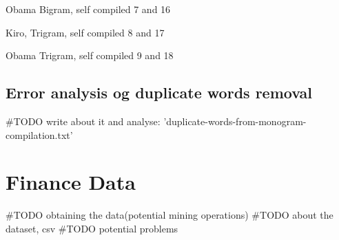 Obama Bigram, self compiled
7 and 16

Kiro, Trigram, self compiled
8 and 17

Obama Trigram, self compiled
9 and 18
%

\subsection{Error analysis og duplicate words removal}
#TODO write about it and analyse:
'duplicate-words-from-monogram-compilation.txt'
%

\section{Finance Data}\label{data:finance}
#TODO obtaining the data(potential mining operations)
#TODO about the dataset, csv
#TODO potential problems 
%

